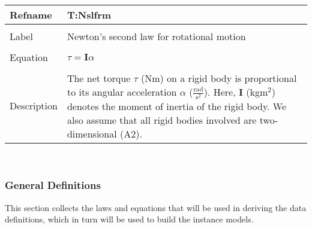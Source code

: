 \documentclass[12pt]{article}
\begin{document}
~\newline
\noindent \begin{minipage}{\textwidth}
\begin{tabular}{p{} p{}}
\toprule \textbf{Refname} & \textbf{T:Nslfrm}
\label{T:Nslfrm}
\\ \midrule \\
Label & Newton's second law for rotational motion
\\ \midrule \\
Equation & $\tau{}=\mathbf{I}\alpha{}$
\\ \midrule \\
Description & The net torque $\tau{}$ (Nm) on a rigid body is proportional to its angular acceleration $\alpha{}$ ($\frac{\text{rad}}{\text{s}^{2}}$). Here, $\mathbf{I}$ (kg$\text{m}^{2}$) denotes the moment of inertia of the rigid body. We also assume that all rigid bodies involved are two-dimensional (A2).
\\ \bottomrule \end{tabular}
\end{minipage}\\
\subsubsection{General Definitions}
\label{Sec:GD}
This section collects the laws and equations that will be used in deriving the data definitions, which in turn will be used to build the instance models.
\end{document}
